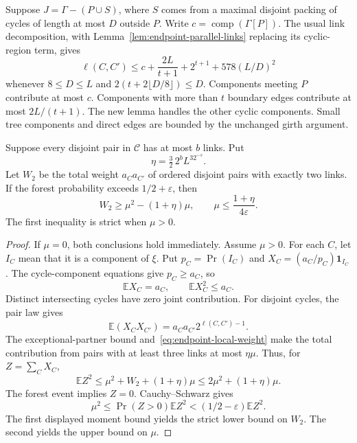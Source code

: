 Suppose $J=\Gamma-(P\cup S)$, where $S$ comes from a maximal disjoint packing of cycles of length at most $D$ outside $P$.
Write $c=\operatorname{comp}(\Gamma[P])$.
The usual link decomposition, with Lemma~\ref{lem:endpoint-parallel-links} replacing its cyclic-region term, gives
\begin{equation}\label{eq:endpoint-link-estimate}
 \ell(C,C')
 \le c+\frac{2L}{t+1}+2^{t+1}+578(L/D)^2
\end{equation}
whenever $8\le D\le L$ and $2(t+2\lfloor D/8\rfloor)\le D$.
Components meeting $P$ contribute at most $c$.
Components with more than $t$ boundary edges contribute at most $2L/(t+1)$.
The new lemma handles the other cyclic components.
Small tree components and direct edges are bounded by the unchanged girth argument.

\begin{lemma}
\label{lem:endpoint-two-link-moment}
Suppose every disjoint pair in $\mathcal C$ has at most $b$ links.
Put
\[
 \eta=\tfrac32\,2^bL^32^{-s}.
\]
Let $W_2$ be the total weight $a_Ca_{C'}$ of ordered disjoint pairs with exactly two links.
If the forest probability exceeds $1/2+\varepsilon$, then
\begin{equation}\label{eq:endpoint-moment-conclusions}
 W_2\ge\mu^2-(1+\eta)\mu,
 \qquad
 \mu\le\frac{1+\eta}{4\varepsilon}.
\end{equation}
The first inequality is strict when $\mu>0$.
\end{lemma}

\begin{proof}
If $\mu=0$, both conclusions hold immediately.
Assume $\mu>0$.
For each $C$, let $I_C$ mean that it is a component of $\xi$.
Put $p_C=\Pr(I_C)$ and $X_C=(a_C/p_C)\mathbf1_{I_C}$.
The cycle-component equations give $p_C\ge a_C$, so
\[
 \mathbb EX_C=a_C,\qquad \mathbb EX_C^2\le a_C.
\]
Distinct intersecting cycles have zero joint contribution.
For disjoint cycles, the pair law gives
\[
 \mathbb E(X_CX_{C'})=a_Ca_{C'}2^{\ell(C,C')-1}.
\]
The exceptional-partner bound and~\eqref{eq:endpoint-local-weight} make the total contribution from pairs with at least three links at most $\eta\mu$.
Thus, for $Z=\sum_CX_C$,
\[
 \mathbb EZ^2\le\mu^2+W_2+(1+\eta)\mu
 \le2\mu^2+(1+\eta)\mu.
\]
The forest event implies $Z=0$.
Cauchy--Schwarz gives
\[
 \mu^2\le\Pr(Z>0)\mathbb EZ^2
 <(1/2-\varepsilon)\mathbb EZ^2.
\]
The first displayed moment bound yields the strict lower bound on $W_2$.
The second yields the upper bound on $\mu$.
\end{proof}

